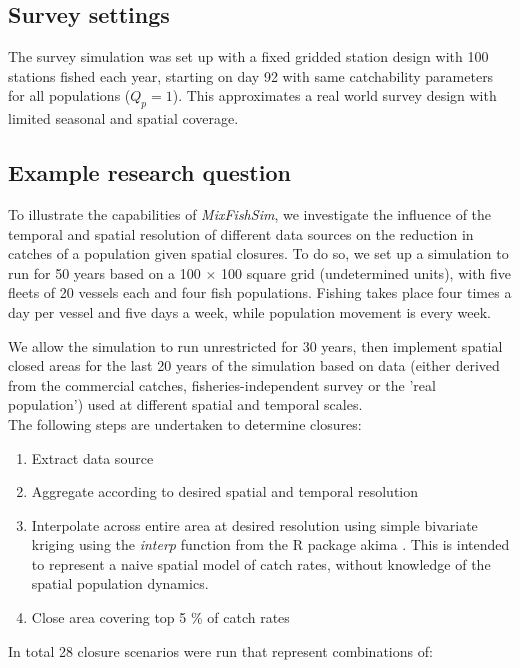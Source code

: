 \documentclass[review]{elsarticle}
\begin{document}
\subsection{Survey settings}

The survey simulation was set up with a fixed gridded station design with 100
stations fished each year, starting on day 92  with same catchability parameters for all
populations ($Q_{p} = 1$). This approximates a real world survey design with
limited seasonal and spatial coverage. 

\subsection{Example research question}

To illustrate the capabilities of \emph{MixFishSim}, we investigate the
influence of the temporal and spatial resolution of different data sources on
the reduction in catches of a population given spatial closures. To do so, we
set up a simulation to run for 50 years based on a 100 $\times$ 100 square grid
(undetermined units), with five fleets of 20 vessels each and four fish
populations. Fishing takes place four times a day per vessel and five days a
week, while population movement is every week.

We allow the simulation to run unrestricted for 30 years,
then implement spatial closed areas for the last 20 years of the simulation
based on data (either derived from the commercial catches,
fisheries-independent survey or the 'real population') used at different
spatial and temporal scales. \\

The following steps are undertaken to determine closures:
\begin{enumerate}
	\item Extract data source
	\item Aggregate according to desired spatial and temporal resolution
	\item Interpolate across entire area at desired resolution using simple
		bivariate kriging using the \emph{interp} function from the R
		package akima \citep{Akima2006}. This is intended to represent
		a naive spatial model of catch rates, without knowledge of the
		spatial population dynamics.
	\item Close area covering top 5 \% of catch rates 
\end{enumerate}
In total 28 closure scenarios were run that represent combinations of:
\end{document}
